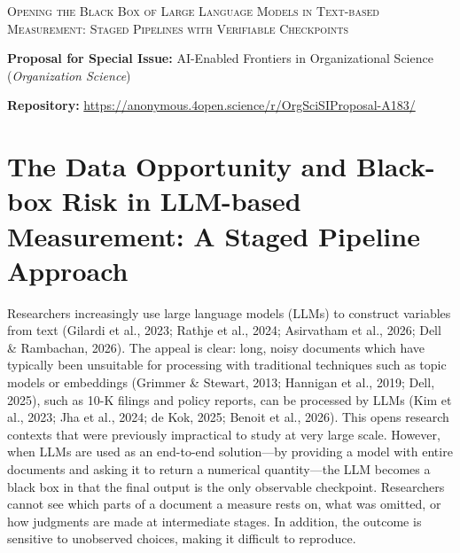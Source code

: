 \documentclass[11pt]{article}
\begin{document}
\begin{center}
    {\LARGE \textsc{Opening the Black Box of Large Language Models in Text-based Measurement: Staged Pipelines with Verifiable Checkpoints}\par}
    \vspace{1.2em}
    {\footnotesize\textbf{Proposal for Special Issue:} AI-Enabled Frontiers in Organizational Science (\textit{Organization Science})\par}
    \vspace{0.3em}
    {\footnotesize\textbf{Repository:} \url{https://anonymous.4open.science/r/OrgSciSIProposal-A183/}\par}
\end{center}

\vspace{1.5em}

\section{The Data Opportunity and Black-box Risk in LLM-based Measurement: A Staged Pipeline Approach}

Researchers increasingly use large language models (LLMs) to construct variables from text (Gilardi et al., 2023; Rathje et al., 2024; Asirvatham et al., 2026; Dell \& Rambachan, 2026). The appeal is clear: long, noisy documents which have typically been unsuitable for processing with traditional techniques such as topic models or embeddings (Grimmer \& Stewart, 2013; Hannigan et al., 2019; Dell, 2025), such as 10-K filings and policy reports, can be processed by LLMs (Kim et al., 2023; Jha et al., 2024; de Kok, 2025; Benoit et al., 2026). This opens research contexts that were previously impractical to study at very large scale. However, when LLMs are used as an end-to-end solution---by providing a model with entire documents and asking it to return a numerical quantity---the LLM becomes a black box in that the final output is the only observable checkpoint. Researchers cannot see which parts of a document a measure rests on, what was omitted, or how judgments are made at intermediate stages. In addition, the outcome is sensitive to unobserved choices, making it difficult to reproduce.
\end{document}
